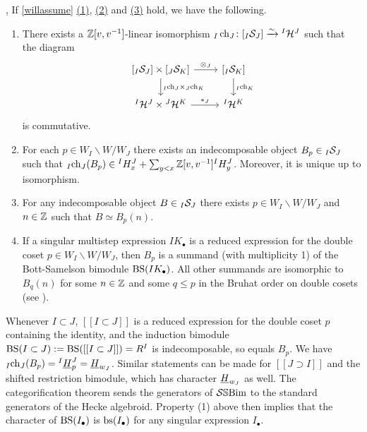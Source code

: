 \begin{theorem} \cite[Theorem 1, Theorem 2]{WillSingular}, \cite[Theorem 1.1]{Abe} \label{thm-categorification}
    If \cref{willassume} \hyperref[assumption 1]{(1)}, \hyperref[assumption 2]{(2)} and \hyperref[assumption 3]{(3)} hold, we have the following.
\begin{enumerate}
\item There exists a $\mathbb{Z}[v,v^{-1}]$-linear isomorphism ${}_{I}\operatorname{ch}_{J}\colon [{}_{I}\mathcal{S}_{J}]\xrightarrow{\sim}{}^I{\mathcal{H}}^J$ such that the diagram
\[
\begin{tikzcd}\relax
[\SBimod{I}{J}]\times [\SBimod{J}{K}]\arrow[r,"\otimes_{J}"]\arrow[d,"{}_{I}{\ch}_{J}\times {}_{J}{\ch}_{K}"] &\relax [\SBimod{I}{K}]\arrow[d,"{}_{I}{\ch}_{K}"]\\
{}^{I}{\mathcal{H}}^{J}\times{}^{J}{\mathcal{H}}^{K}\arrow[r,"*_{J}"] & {}^{I}{\mathcal{H}}^{K}
\end{tikzcd}
\]
is commutative.
\item For each $p\in W_{I}\backslash W/W_{J}$ there exists an indecomposable object
$B_p \in {}_{I}\mathcal{S}_{J}$
such that
${}_{I}{\operatorname{ch}}_{J}(B_p)\in {}^{I}{H}^{J}_{x} + \sum_{y < x}\mathbb{Z}[v,v^{-1}]{}^{I}{H}^{J}_{y}$.
Moreover, it is unique up to isomorphism.
\item For any indecomposable object $B\in {}_{I}\mathcal{S}_{J}$ there exists $p\in W_{I}\backslash W/W_{J}$ and $n\in \mathbb{Z}$ such that
$B \simeq B_p(n)$.
\item If a singular multistep expression $IK_{\bullet}$ is a reduced expression for the double coset $p \in W_{I}\backslash W/W_{J}$, then $B_p$ is a summand (with multiplicity 1) of the Bott-Samelson bimodule $\operatorname{BS}(IK_{\bullet})$. All other summands are isomorphic to $B_q(n)$ for some $n \in \mathbb{Z}$ and some $q \le p$ in the Bruhat order on double cosets (see \cite[Proposition 3.3]{KELPBruhat}).
\end{enumerate}
\end{theorem}

Whenever $I \subset J$, $[[I \subset J]]$ is a reduced expression for the double coset $p$ containing the identity, and the induction bimodule $\operatorname{BS}(I \subset J) := \operatorname{BS}([[I \subset J]]) = R^I$ is indecomposable, so equals $B_p$. We have ${}_{I}{\operatorname{ch}}_{J}(B_p) = {}^I\underline{H}^J_p = \underline{H}_{w_J}$. Similar statements can be made for $[[J \supset I]]$ and the shifted restriction bimodule, which has character $\underline{H}_{w_J}$ as well. The categorification theorem sends the generators of $\mathcal{S}\mathbb{S}\text{Bim}$ to the standard generators of the Hecke algebroid. Property (1) above then implies that the character of $\operatorname{BS}(I_{\bullet})$ is $\operatorname{bs}(I_{\bullet})$ for any singular expression $I_{\bullet}$.


